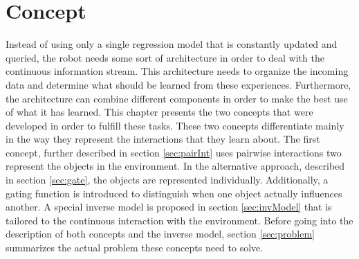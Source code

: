 \chapter{Concept \label{chap:concept}}



Instead of using only a single regression model that is constantly updated and queried, the robot needs some sort of architecture in order to deal with the continuous information stream. This architecture needs to organize the incoming data and determine what should be learned from these experiences. Furthermore, the architecture can combine different components in order to make the best use of what it has learned. 
This chapter presents the two concepts that were developed in order to fulfill these tasks. These two concepts differentiate mainly in the way they represent the interactions that they learn about. The first concept, further described in section \ref{sec:pairInt} uses pairwise interactions two represent the objects in the environment. In the alternative approach, described in section \ref{sec:gate}, the objects are represented individually. Additionally, a gating function is introduced to distinguish when one object actually influences another. 
A special inverse model is proposed in section \ref{sec:invModel} that is tailored to the continuous interaction with the environment. %
Before going into the description of both concepts and the inverse model, section \ref{sec:problem} summarizes the actual problem these concepts need to solve. 

%

